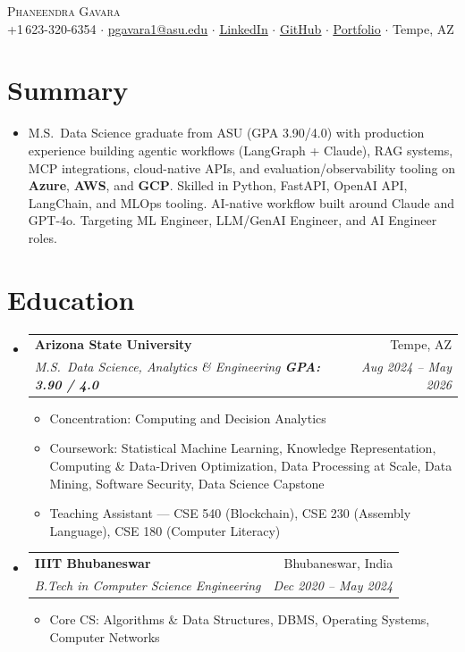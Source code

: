\documentclass[letterpaper,10pt]{article}
\makeatletter
\newcommand{\resumeItem}[1]{\item\small{#1\vspace{-2pt}}}
\newcommand{\resumeSubheading}[4]{
  \vspace{-2pt}\item
  \begin{tabular*}{0.97\textwidth}[t]{l@{\extracolsep{\fill}}r}
    \textbf{\small#1} & \small#2 \\
    \textit{\small#3} & \textit{\small#4} \\
  \end{tabular*}\vspace{-6pt}
}
\newcommand{\resumeSubHL}{\begin{itemize}[leftmargin=0.12in,label={}]}
\newcommand{\resumeSubHLE}{\end{itemize}}
\newcommand{\resumeIL}{\begin{itemize}[leftmargin=0.18in,topsep=1pt,itemsep=0pt]}
\newcommand{\resumeILE}{\end{itemize}\vspace{-3pt}}
\makeatother
\begin{document}
\begin{center}
  {\LARGE\scshape Phaneendra Gavara}\\[3pt]
  \small
  +1\,623-320-6354 $\cdot$
  \href{mailto:pgavara1@asu.edu}{\underline{pgavara1@asu.edu}} $\cdot$
  \href{https://www.linkedin.com/in/phaneendra-gavara}{\underline{LinkedIn}} $\cdot$
  \href{https://github.com/PHANI465}{\underline{GitHub}} $\cdot$
  \href{https://phaneendragavara.dev/}{\underline{Portfolio}} $\cdot$
  Tempe, AZ
\end{center}

\vspace{-2pt}

\section{Summary}
\begin{itemize}[leftmargin=0.12in,label={},topsep=0pt]
  \small\item{
    M.S.\ Data Science graduate from ASU (GPA 3.90/4.0) with production experience building agentic workflows (LangGraph + Claude), RAG systems, MCP integrations, cloud-native APIs, and evaluation/observability tooling on \textbf{Azure}, \textbf{AWS}, and \textbf{GCP}. Skilled in Python, FastAPI, OpenAI API, LangChain, and MLOps tooling. AI-native workflow built around Claude and GPT-4o. Targeting ML Engineer, LLM/GenAI Engineer, and AI Engineer roles.
  }
\end{itemize}

\section{Education}
\resumeSubHL
  \resumeSubheading
    {Arizona State University}{Tempe, AZ}
    {M.S.\ Data Science, Analytics \& Engineering \quad \textbf{GPA: 3.90 / 4.0}}{Aug 2024 -- May 2026}
    \resumeIL
      \resumeItem{Concentration: Computing and Decision Analytics}
      \resumeItem{Coursework: Statistical Machine Learning, Knowledge Representation, Computing \& Data-Driven Optimization, Data Processing at Scale, Data Mining, Software Security, Data Science Capstone}
      \resumeItem{Teaching Assistant --- CSE 540 (Blockchain), CSE 230 (Assembly Language), CSE 180 (Computer Literacy)}
    \resumeILE
  \resumeSubheading
    {IIIT Bhubaneswar}{Bhubaneswar, India}
    {B.Tech in Computer Science Engineering}{Dec 2020 -- May 2024}
    \resumeIL
      \resumeItem{Core CS: Algorithms \& Data Structures, DBMS, Operating Systems, Computer Networks}
    \resumeILE
\resumeSubHLE
\end{document}
